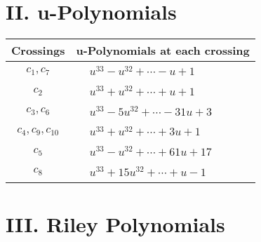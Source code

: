 \documentclass[1p]{elsarticle_modified}
\theoremstyle{definition}
\begin{document}
\newpage\renewcommand{\arraystretch}{1}
\centering \section*{ II. u-Polynomials}
\begin{tabular}{m{50pt}|m{274pt}}
Crossings & \hspace{64pt}u-Polynomials at each crossing \\
\hline $$\begin{aligned}c_{1},c_{7}\end{aligned}$$&$\begin{aligned}
&u^{33}- u^{32}+\cdots- u+1
\end{aligned}$\\
\hline $$\begin{aligned}c_{2}\end{aligned}$$&$\begin{aligned}
&u^{33}+u^{32}+\cdots+u+1
\end{aligned}$\\
\hline $$\begin{aligned}c_{3},c_{6}\end{aligned}$$&$\begin{aligned}
&u^{33}-5 u^{32}+\cdots-31 u+3
\end{aligned}$\\
\hline $$\begin{aligned}c_{4},c_{9},c_{10}\end{aligned}$$&$\begin{aligned}
&u^{33}+u^{32}+\cdots+3 u+1
\end{aligned}$\\
\hline $$\begin{aligned}c_{5}\end{aligned}$$&$\begin{aligned}
&u^{33}- u^{32}+\cdots+61 u+17
\end{aligned}$\\
\hline $$\begin{aligned}c_{8}\end{aligned}$$&$\begin{aligned}
&u^{33}+15 u^{32}+\cdots+u-1
\end{aligned}$\\
\hline
\end{tabular}\newpage\renewcommand{\arraystretch}{1}
\centering \section*{ III. Riley Polynomials}
\end{document}
